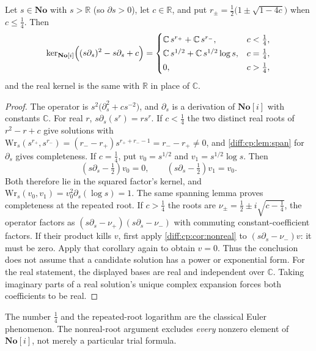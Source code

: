 \documentclass[11pt,letterpaper]{article}
\numberwithin{equation}{section}
\theoremstyle{definition}
\theoremstyle{remark}
\newcommand{\No}{\mathbf{No}}
\newcommand{\SC}{\mathbf{No}[i]}
\newcommand{\R}{\mathbb R}
\newcommand{\C}{\mathbb C}
\newcommand{\der}{\partial}
\newcommand{\Ker}{\operatorname{ker}}
\begin{document}
\begin{proposition}
\label{diff:cp:prop:euler}
Let $s\in\No$ with $s>\R$ (so $\der s>0$), let $c\in\R$, and put
$r_{\pm}=\frac12\bigl(1\pm\sqrt{1-4c}\bigr)$ when $c\leq\frac14$. Then
\[
 \Ker_{\SC}\Bigl((s\der_{s})^{2}-s\der_{s}+c\Bigr)=
 \begin{cases}
 \C\,s^{r_{+}}+\C\,s^{r_{-}}, & c<\frac14,\\[0.2em]
 \C\,s^{1/2}+\C\,s^{1/2}\log s, & c=\frac14,\\[0.2em]
 0, & c>\frac14,
 \end{cases}
\]
and the real kernel is the same with $\R$ in place of $\C$.
\end{proposition}
\begin{proof}
The operator is $s^{2}\bigl(\der_{s}^{2}+cs^{-2}\bigr)$, and $\der_{s}$ is a
derivation of $\SC$ with constants $\C$. For real $r$, $s\der_{s}(s^{r})=rs^{r}$.
If $c<\frac14$ the two distinct real roots of $r^{2}-r+c$ give solutions with
$\mathrm{Wr}_{s}(s^{r_{+}},s^{r_{-}})=(r_{-}-r_{+})s^{r_{+}+r_{-}-1}=r_{-}-r_{+}\neq0$,
and \cref{diff:cp:lem:span} for $\der_{s}$ gives completeness. If $c=\frac14$,
put $v_{0}=s^{1/2}$ and $v_{1}=s^{1/2}\log s$. Then
\[
 (s\der_{s}-\tfrac12)v_{0}=0,\qquad
 (s\der_{s}-\tfrac12)v_{1}=v_{0}.
\]
Both therefore lie in the squared factor's kernel, and
$\mathrm{Wr}_{s}(v_{0},v_{1})=v_{0}^{2}\der_{s}(\log s)=1$.
The same spanning lemma proves completeness at the repeated root.
If $c>\frac14$ the roots are
$\nu_{\pm}=\frac12\pm i\sqrt{c-\frac14}$, the operator factors as
$(s\der_{s}-\nu_{+})(s\der_{s}-\nu_{-})$ with commuting constant-coefficient
factors. If their product kills $v$, first apply
\cref{diff:cp:cor:nonreal} to
$(s\der_{s}-\nu_{-})v$: it must be zero. Apply that corollary
again to obtain $v=0$. Thus the conclusion does not assume
that a candidate solution has a power or exponential form.
For the real statement, the displayed bases are real and
independent over $\C$. Taking imaginary parts of a real solution's
unique complex expansion forces both coefficients to be real.
\end{proof}

The number $\frac14$ and the repeated-root logarithm are the classical Euler
phenomenon. The nonreal-root argument excludes \emph{every} nonzero element of
$\SC$, not merely a particular trial formula.
\end{document}
